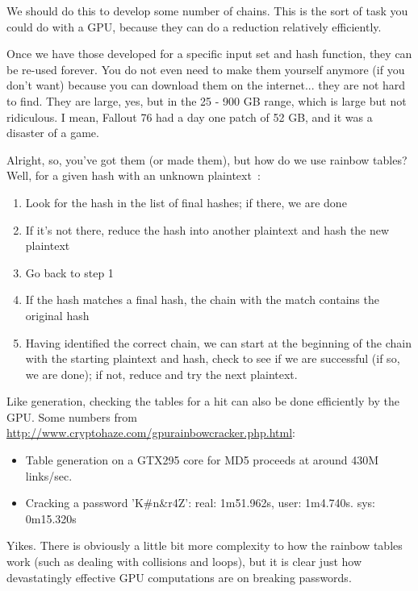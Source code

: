 \documentclass[a4paper]{report}
\begin{document}
We should do this to develop some number of chains. This is the sort of task you could do with a GPU, because they can do a reduction relatively efficiently. 

Once we have those developed for a specific input set and hash function, they can be re-used forever. You do not even need to make them yourself anymore (if you don't want) because you can download them on the internet... they are not hard to find. They are large, yes, but in the 25 - 900 GB range, which is large  but not ridiculous. I mean, Fallout 76 had a day one patch of 52 GB, and it was a disaster of a game.

Alright, so, you've got them (or made them), but how do we use rainbow tables? Well, for a given hash with an unknown plaintext~\cite{rainbowtables}:
\begin{enumerate}
	\item Look for the hash in the list of final hashes; if there, we are done
	\item If it's not there, reduce the hash into another plaintext and hash the new plaintext
	\item Go back to step 1
	\item If the hash matches a final hash, the chain with the match contains the original hash
	\item Having identified the correct chain, we can start at the beginning of the chain with the starting plaintext and hash, check to see if we are successful (if so, we are done); if not, reduce and try the next plaintext. 
\end{enumerate} 

Like generation, checking the tables for a hit can also be done efficiently by the GPU. Some numbers from \url{http://www.cryptohaze.com/gpurainbowcracker.php.html}: 
\begin{itemize}
	\item Table generation on a GTX295 core for MD5 proceeds at around 430M links/sec.
	\item Cracking a password 'K\#n\&r4Z': real: 1m51.962s, user: 1m4.740s. sys: 0m15.320s
\end{itemize}

Yikes. There is obviously a little bit more complexity to how the rainbow tables work (such as dealing with collisions and loops), but it is clear just how devastatingly effective GPU computations are on breaking passwords.
\end{document}
